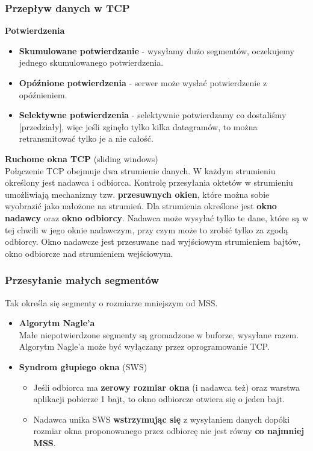 \documentclass[../main.tex]{subfiles}
\begin{document}
    \subsubsection{Przepływ danych w TCP}
    \textbf{Potwierdzenia}
    \begin{itemize}
        \item \textbf{Skumulowane potwierdzanie} - wysyłamy dużo segmentów, oczekujemy jednego skumulowanego potwierdzenia.
        \item \textbf{Opóźnione potwierdzenia} - serwer może wysłać potwierdzenie z opóźnieniem.
        \item \textbf{Selektywne potwierdzenia} - selektywnie potwierdzamy co dostaliśmy [przedziały], więc jeśli zginęło tylko kilka datagramów, to można retransmitować tylko je a nie całość.
    \end{itemize}

    \textbf{Ruchome okna TCP} (sliding windows)\\
    Połączenie TCP obejmuje dwa strumienie danych. W każdym strumieniu określony jest
    nadawca i odbiorca. Kontrolę przesyłania oktetów w strumieniu umożliwiają mechanizmy
    tzw. \textbf{przesuwnych okien}, które można sobie wyobrazić jako nałożone na
    strumień. Dla strumienia określone jest \textbf{okno nadawcy} oraz \textbf{okno odbiorcy}. Nadawca może
    wysyłać tylko te dane, które są w tej chwili w jego oknie nadawczym, przy czym może to
    zrobić tylko za zgodą odbiorcy. Okno nadawcze jest przesuwane nad wyjściowym
    strumieniem bajtów, okno odbiorcze nad strumieniem wejściowym.\\

    \subsubsection{Przesyłanie małych segmentów}
    Tak określa się segmenty o rozmiarze mniejszym od MSS.
    \begin{itemize}
        \item \textbf{Algorytm Nagle’a}\\
        Małe niepotwierdzone segmenty są gromadzone w buforze, wysyłane razem.
        Algorytm Nagle’a może być wyłączany przez oprogramowanie TCP.
        \item \textbf{Syndrom głupiego okna} (SWS)\\
        \begin{itemize}
            \item Jeśli odbiorca ma \textbf{zerowy rozmiar okna} (i nadawca też) oraz warstwa aplikacji pobierze 1
            bajt, to okno odbiorcze otwiera się o jeden bajt.
            \item Nadawca unika SWS \textbf{wstrzymując się} z wysyłaniem danych dopóki rozmiar okna proponowanego przez odbiorcę nie jest równy \textbf{co najmniej MSS}.
        \end{itemize}
    \end{itemize}
\end{document}

